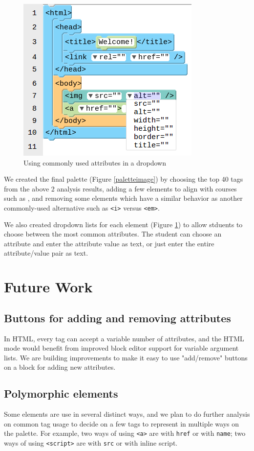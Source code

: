 \documentclass[conference]{IEEEtran}
\begin{document}
\begin{figure}
\centering
\includegraphics[width=0.6\columnwidth]{dropdown.png}
\caption{Using commonly used attributes in a dropdown}
\label{dropdownimage}
\end{figure}

We created the final palette (Figure \ref{paletteimage}) by choosing the top 40 tags from the above 2 analysis results, adding a few elements to align with courses such as \cite{htmltutor1} \cite{htmltutor2} \cite{htmltutor3}, and removing some elements which have a similar behavior as another commonly-used alternative such as \texttt{<i>} versus \texttt{<em>}.

We also created dropdown lists for each element (Figure \ref{dropdownimage}) to allow stduents to choose between the most common attributes.  The student can choose an attribute and enter the attribute value as text, or just enter the entire attribute/value pair as text.

\section{Future Work}

\subsection{Buttons for adding and removing attributes}
In HTML, every tag can accept a variable number of attributes, and the HTML mode would benefit from improved block editor support for variable argument lists.  We are building improvements to make it easy to use "add/remove" buttons on a block for adding new attributes.

\subsection{Polymorphic elements}
Some elements are use in several distinct ways, and we plan to do further analysis on common tag usage to decide on a few tags to represent in multiple ways on the palette.  For example, two ways of using \texttt{<a>} are with \texttt{href} or with \texttt{name}; two ways of using \texttt{<script>} are with \texttt{src} or with inline script.
\end{document}

